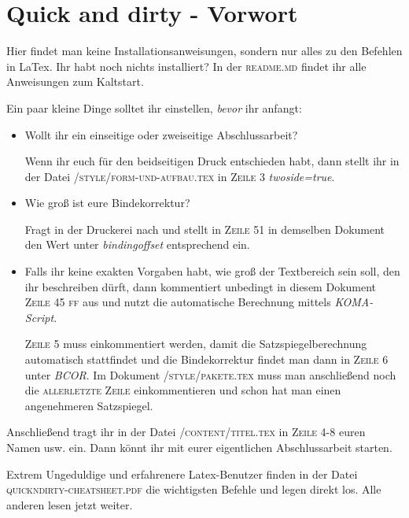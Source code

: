 \chapter{Quick and dirty - Vorwort}%
\label{chap: vorwort}%
Hier findet man keine Installationsanweisungen, sondern nur alles zu den Befehlen in LaTex. Ihr habt noch nichts installiert? In der \textsc{readme.md} findet ihr alle Anweisungen zum Kaltstart.%


Ein paar kleine Dinge solltet ihr einstellen, \emph{bevor} ihr anfangt:%
\begin{itemize}%
\item Wollt ihr ein einseitige oder zweiseitige Abschlussarbeit?%

Wenn ihr euch für den beidseitigen Druck entschieden habt, dann stellt ihr in der Datei \textsc{/style/form-und-aufbau.tex} in \textsc{Zeile 3} \emph{twoside=true}.%
\item Wie groß ist eure Bindekorrektur?%

Fragt in der Druckerei nach und stellt in \textsc{Zeile 51} in demselben Dokument den Wert unter \emph{bindingoffset} entsprechend ein.%
\item Falls ihr keine exakten Vorgaben habt, wie groß der Textbereich sein soll, den ihr beschreiben dürft, dann kommentiert unbedingt in diesem Dokument \textsc{Zeile 45 ff} aus und nutzt die automatische Berechnung mittels \emph{KOMA-Script}.%

\textsc{Zeile 5} muss einkommentiert werden, damit die Satzspiegelberechnung automatisch stattfindet und die Bindekorrektur findet man dann in  \textsc{Zeile 6} unter \emph{BCOR}. Im Dokument \textsc{/style/pakete.tex} muss man anschließend noch die \textsc{allerletzte Zeile} einkommentieren und schon hat man einen angenehmeren Satzspiegel.%
\end{itemize}%
Anschließend tragt ihr in der Datei \textsc{/content/titel.tex} in \textsc{Zeile 4-8} euren Namen usw. ein. Dann könnt ihr mit eurer eigentlichen Abschlussarbeit starten.%

Extrem Ungeduldige und erfahrenere Latex-Benutzer finden in der Datei \textsc{quickndirty-cheatsheet.pdf} die wichtigsten Befehle und legen direkt los. Alle anderen lesen jetzt weiter.%
\newpage